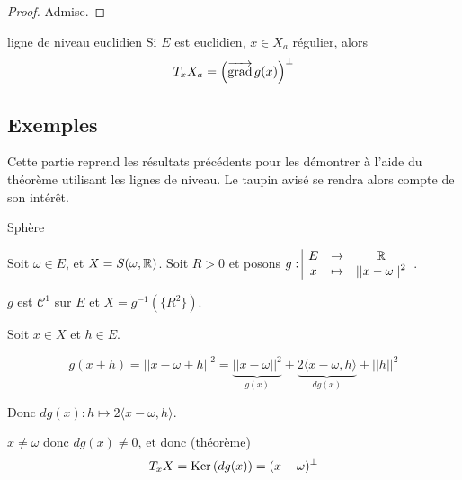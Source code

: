 \begin{proof}
    Admise. 
\end{proof}

\begin{corollaire}{ligne de niveau euclidien}{}
    Si $E$ est euclidien, $x \in X_a$ régulier, alors 
    $$T_xX_a = \left(\overrightarrow{\operatorname{grad}} \, g(x) \right)^\perp$$
\end{corollaire}

\subsection{Exemples}

Cette partie reprend les résultats précédents pour les démontrer à l'aide du théorème utilisant les 
lignes de niveau. Le taupin avisé se rendra alors compte de son intérêt.

\begin{exemple}
    Sphère 

    Soit $\omega \in E$, et $X = S(\omega, \mathbb{R})$. 
    Soit $R > 0$ et posons $g: \space \begin{array}{|ccc} \displaystyle E & \to & \displaystyle \mathbb{R} \\ \displaystyle x & \mapsto & \displaystyle ||x - \omega||^2 \end{array}$.

    $g$ est $\mathscr C^1$ sur $E$ et $X = g^{-1}(\{R^2\})$.

    Soit $x \in X$ et $h \in E$. 

    $$g(x + h) = ||x - \omega + h ||^2 = \underbrace{||x- \omega||^2}_{g(x)} + \underbrace{2 \langle x - \omega, h \rangle}_{dg(x)} + ||h||^2$$

    Donc $dg(x) : h \mapsto 2 \langle x - \omega, h \rangle$.

    $x \neq \omega$ donc $dg(x) \neq 0$, et donc (théorème)
    $$T_xX = \operatorname{Ker} \,(dg(x)) = (x - \omega)^\perp$$
\end{exemple}

